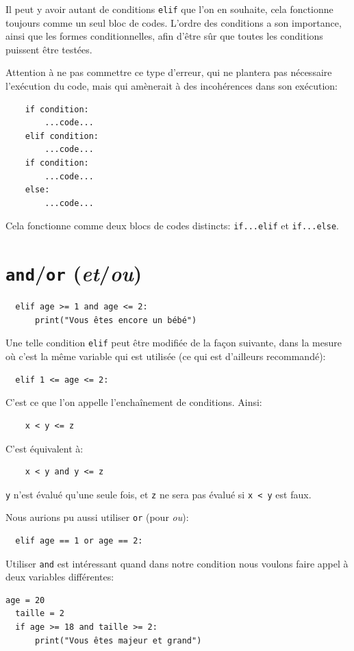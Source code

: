 \documentclass[a4paper,11pt]{book}
\begin{document}
Il peut y avoir autant de conditions \texttt{elif} que l'on en souhaite, cela fonctionne toujours comme un seul bloc de codes. L'ordre des conditions a son importance, ainsi que les formes conditionnelles, afin d'être sûr que toutes les conditions puissent être testées.
\medskip

Attention à ne pas commettre ce type d'erreur, qui ne plantera pas nécessaire l'exécution du code, mais qui amènerait à des incohérences dans son exécution:
\begin{verbatim}
    if condition:
        ...code...
    elif condition:
        ...code...
    if condition:
        ...code...
    else:
        ...code...
\end{verbatim}
\medskip

Cela fonctionne comme deux blocs de codes distincts: \texttt{if...elif} et \texttt{if...else}.
\medskip

\section{\texttt{and}/\texttt{or} (\textit{et}/\textit{ou})}
\begin{lstlisting}
  elif age >= 1 and age <= 2:
  	  print("Vous êtes encore un bébé")
\end{lstlisting}
\medskip

Une telle condition \texttt{elif} peut être modifiée de la façon suivante, dans la mesure où c'est la même variable qui est utilisée (ce qui est d'ailleurs recommandé):
\begin{lstlisting}
  elif 1 <= age <= 2:
\end{lstlisting}
\medskip

C'est ce que l'on appelle l'enchaînement de conditions. Ainsi:
\begin{verbatim}
    x < y <= z
\end{verbatim}
\medskip

C'est équivalent à:
\begin{verbatim}
    x < y and y <= z
\end{verbatim}
\medskip

\texttt{y} n'est évalué qu'une seule fois, et \texttt{z} ne sera pas évalué si \texttt{x < y} est faux.
\medskip

Nous aurions pu aussi utiliser \texttt{or} (pour \textit{ou}):
\begin{lstlisting}
  elif age == 1 or age == 2:
\end{lstlisting}
\medskip

Utiliser \texttt{and} est intéressant quand dans notre condition nous voulons faire appel à deux variables différentes:
\begin{lstlisting}[caption=\texttt{and} avec deux variables différentes]
  age = 20
  taille = 2
  if age >= 18 and taille >= 2:
  	  print("Vous êtes majeur et grand")
\end{lstlisting}
\medskip
\end{document}
